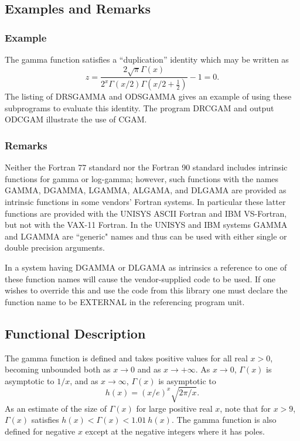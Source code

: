 \documentclass[twoside]{MATH77}
\begin{document}
\subsection{Examples and Remarks}

\subsubsection{Example}

The gamma function satisfies a ``duplication'' identity which may be written
as%
\begin{equation*}
z=\frac{2\sqrt{\pi }\Gamma (x)}{2^x\Gamma (x/2)\Gamma (x/2+\frac 12)}-1=0.
\end{equation*}
The listing of DRSGAMMA and ODSGAMMA gives an example of using these
subprograms to evaluate this identity. The program DRCGAM and output ODCGAM
illustrate the use of CGAM.

\subsubsection{Remarks}

Neither the Fortran 77 standard nor the Fortran 90 standard includes
intrinsic functions for gamma or log-gamma; however, such functions with the
names GAMMA, DGAMMA, LGAMMA, ALGAMA, and DLGAMA are provided as intrinsic
functions in some vendors' Fortran systems. In particular these latter
functions are provided with the UNISYS ASCII Fortran and IBM VS-Fortran, but
not with the VAX-11 Fortran. In the UNISYS and IBM systems GAMMA and LGAMMA
are ``generic" names and thus can be used with either single or double
precision arguments.

In a system having DGAMMA or DLGAMA as intrinsics a reference to one of
these function names will cause the vendor-supplied code to be used. If one
wishes to override this and use the code from this library one must declare
the function name to be EXTERNAL in the referencing program unit.

\subsection{Functional Description}

The gamma function is defined and takes positive values for all real $x>0$,
becoming unbounded both as $x\rightarrow 0$ and as $x\rightarrow +\infty $.
As $x\rightarrow 0$, $\Gamma (x)$ is asymptotic to $1/x$, and as $%
x\rightarrow \infty $, $\Gamma (x)$ is asymptotic to%
\begin{equation*}
h(x)=\left( x/e\right) ^x\sqrt{2\pi /x}.
\end{equation*}
As an estimate of the size of $\Gamma (x)$ for large positive real $x$, note
that for $x>9$, $\Gamma (x)$ satisfies $h(x)<\Gamma (x)<1.01\ h(x)$. The
gamma function is also defined for negative $x$ except at the negative
integers where it has poles.
\end{document}
